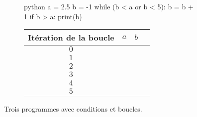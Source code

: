 \begin{figure}[h]
\begin{subfigure}{.5\textwidth}
\vspace{15pt}
\begin{mintedbox}{python}
a = 2.5
b = -1
while (b < a or b < 5):
	b = b + 1
	if b > a:
		print(b)
\end{mintedbox}
\end{subfigure}
\hfill
\begin{subfigure}{.45\textwidth}
	\begin{tabular}{|c|c|c|c|}\hline
		Itération de la boucle & $a$ & $b$ \\ \hline
		$0$ && \\ \hline
		$1$ && \\ \hline
		$2$ && \\ \hline
		$3$ && \\ \hline
		$4$ && \\ \hline
		$5$ && \\ \hline
	\end{tabular}
\end{subfigure}

\caption{Trois programmes avec conditions et boucles.}
\label{fig:2}
\end{figure}





